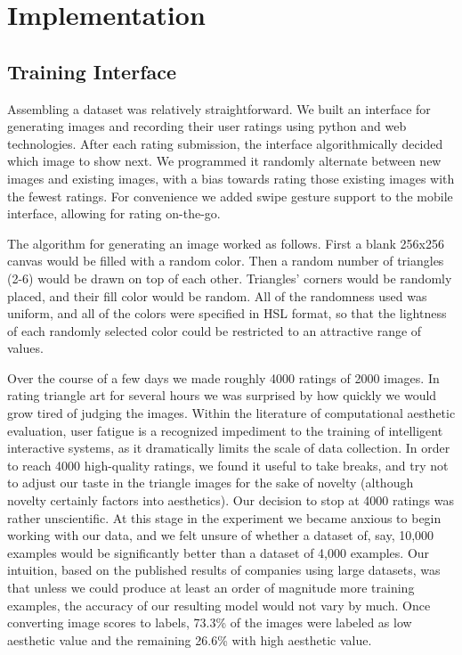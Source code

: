 \documentclass[midd]{thesis}
\begin{document}
\chapter{Implementation}
\section{Training Interface}

Assembling a dataset was relatively straightforward. We built an interface for generating images and recording their user ratings using python and web technologies. After each rating submission, the interface algorithmically decided which image to show next. We programmed it randomly alternate between new images and existing images, with a bias towards rating those existing images with the fewest ratings.
For convenience we added swipe gesture support to the mobile interface, allowing for rating on-the-go.

The algorithm for generating an image worked as follows. First a blank 256x256 canvas would be filled with a random color. Then a random number of triangles (2-6) would be drawn on top of each other. Triangles' corners would be randomly placed, and their fill color would be random. All of the randomness used was uniform, and all of the colors were specified in HSL format, so that the lightness of each randomly selected color could be restricted to an attractive range of values.

Over the course of a few days we made roughly 4000 ratings of 2000 images. In rating triangle art for several hours we was surprised by how quickly we would grow tired of judging the images. Within the literature of computational aesthetic evaluation, user fatigue is a recognized impediment to the training of intelligent interactive systems, as it dramatically limits the scale of data collection. In order to reach 4000 high-quality ratings, we found it useful to take breaks, and try not to adjust our taste in the triangle images for the sake of novelty (although novelty certainly factors into aesthetics). Our decision to stop at 4000 ratings was rather unscientific. At this stage in the experiment we became anxious to begin working with our data, and we felt unsure of whether a dataset of, say, 10,000 examples would be significantly better than a dataset of 4,000 examples. 
Our intuition, based on the published results of companies using large datasets, was that unless we could produce at least an order of magnitude more training examples, the accuracy of our resulting model would not vary by much. Once converting image scores to labels, 73.3\% of the images were labeled as low aesthetic value and the remaining 26.6\% with high aesthetic value.
\end{document}
